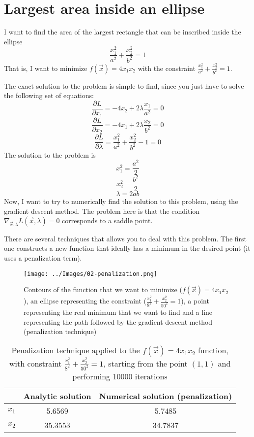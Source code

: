 \section{Largest area inside an ellipse}
    I want to find the area of the largest rectangle that can be inscribed inside the ellipse
    \[\frac{x_1^2}{a^2} + \frac{x_2^2}{b^2} = 1\]
    That is, I want to minimize \(f(\vec{x}) = 4x_1x_2\) with the constraint \(\frac{x_1^2}{a^2} + \frac{x_2^2}{b^2} = 1\).\par
    The exact solution to the problem is simple to find, since you just have to solve the following set of equations:
    \[\frac{\partial L}{\partial x_1} = -4x_2 + 2\lambda\frac{x_1}{a^2} = 0\]
    \[\frac{\partial L}{\partial x_2} = -4x_1 + 2\lambda\frac{x_2}{b^2} = 0\]
    \[\frac{\partial L}{\partial \lambda} = \frac{x_1^2}{a^2} + \frac{x_2^2}{b^2} - 1 = 0\]
    The solution to the problem is
    \[x_1^2 = \frac{a^2}{2}\]
    \[x_2^2 = \frac{b^2}{2}\]
    \[\lambda = 2ab\]
    Now, I want to try to numerically find the solution to this problem, using the gradient descent method. The problem here is that the condition \(\nabla_{\vec{x},\lambda}L(\vec{x},\lambda)=0\) corresponds to a saddle point.\par
    There are several techniques that allows you to deal with this problem. The first one constructs a new function that ideally has a minimum in the desired point (it uses a penalization term).
    \begin{figure}
        \centering
        \texttt{[image: ../Images/02-penalization.png]}
        \caption{Contours of the function that we want to minimize (\(f(\vec{x}) = 4x_1x_2\)), an ellipse representing the constraint (\(\frac{x_1^2}{8^2} + \frac{x_2^2}{50^2} = 1\)), a point representing the real minimum that we want to find and a line representing the path followed by the gradient descent method (penalization technique)}
        \label{penalization}
    \end{figure}
    \begin{table}
        \centering
        \begin{tabu}{| c | c | c |}
            \hline
            &           Analytic solution &   Numerical solution (penalization) \\ \hline
            \(x_1\) &   5.6569 &                5.7485 \\ \hline
            \(x_2\) &   35.3553 &               34.7837 \\ \hline
        \end{tabu}
        \caption{Penalization technique applied to the \(f(\vec{x}) = 4x_1x_2\) function, with constraint \(\frac{x_1^2}{8^2} + \frac{x_2^2}{50^2} = 1\), starting from the point \((1,1)\) and performing \(10000\) iterations}
        \label{penalization-example}
    \end{table}
